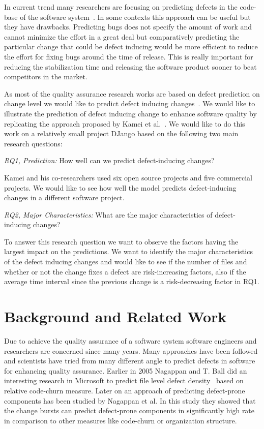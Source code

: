 \documentclass[10pt, conference]{IEEEtran}
\begin{document}
In current trend many researchers are focusing on predicting defects in the code-base of the software system~\cite{Gyimothy2005IEEE}. In some contexts this approach can be useful but they have drawbacks. Predicting bugs does not specify the amount of work and cannot minimize the effort in a great deal but comparatively predicting the particular change that could be defect inducing would be more efficient to reduce the effort for fixing bugs around the time of release. This is really important for reducing the stabilization time and releasing the software product sooner to beat competitors in the market.

As most of the quality assurance research works are based on defect prediction on change level we would like to predict defect inducing changes~\cite{Kim2008TSE}. We would like to illustrate the prediction of defect inducing change to enhance software quality by replicating the approach proposed by Kamei et al.~\cite{Kamei2013TSE}. We would like to do this work on a relatively small project DJango based on the following two main research questions:

\textit{RQ1, Prediction:} How well can we predict defect-inducing changes?

Kamei and his co-researchers used six open source projects and five commercial projects. We would like to see how well the model predicts defect-inducing changes in a different software project.

\textit{RQ2, Major Characteristics:} What are the major characteristics of defect-inducing changes?

To answer this research question we want to observe the factors having the largest impact on the predictions. We want to identify the major characteristics of the defect inducing changes and would like to see if the number of files and whether or not the change fixes a defect are risk-increasing factors, also if the average time interval since the previous change is a risk-decreasing factor in RQ1.

\section{Background and Related Work}
\label{sec:backgr-relat-work}

Due to achieve the quality assurance of a software system software engineers and researchers are concerned since many years. Many approaches have been followed and scientists have tried from many different angle to predict defects in software for enhancing quality assurance. Earlier in 2005 Nagappan and T. Ball did an interesting research in Microsoft to predict file level defect density~\cite{Nagappan2005ICSE} based on relative code-churn measure. Later on an approach of predicting defect-prone components has been studied by Nagappan et al. In this study they showed that the change bursts can predict defect-prone components in significantly high rate in comparison to other measures like code-churn or organization structure.
\end{document}

